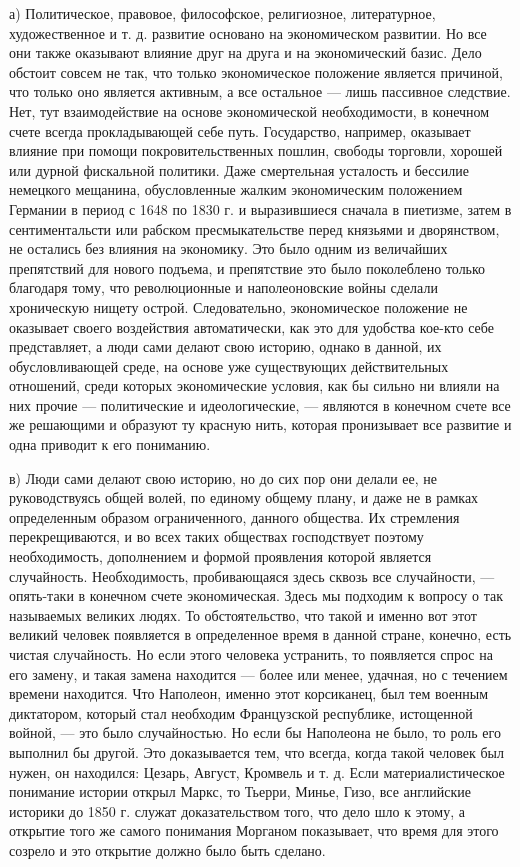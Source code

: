 \documentclass[12pt]{article}
\newcommand{\parnum}{(\arabic{parcount})}
\newcounter{parcount}
\newenvironment{parnumbers}{%
  \par%
  \everypar{\noindent \stepcounter{parcount}\marginpar[]{\parnum}}%
}{}
\begin{document}
\begin{parnumbers}
    а) Политическое, правовое, философское, религиозное, литературное, художественное и т. д. развитие основано на экономическом развитии. Но все они также оказывают влияние друг на друга и на экономический базис. Дело обстоит совсем не так, что только экономическое положение является причиной, что только оно является активным, а все остальное — лишь пассивное следствие. Нет, тут взаимодействие на основе экономической необходимости, в конечном счете всегда прокладывающей себе путь. Государство, например, оказывает влияние при помощи покровительственных пошлин, свободы торговли, хорошей или дурной фискальной политики. Даже смертельная усталость и бессилие немецкого мещанина, обусловленные жалким экономическим положением Германии в период с 1648 по 1830 г. и выразившиеся сначала в пиетизме, затем в сентиментальсти или рабском пресмыкательстве перед князьями и дворянством, не остались без влияния на экономику. Это было одним из величайших препятствий для нового подъема, и препятствие это было поколеблено только благодаря тому, что революционные и наполеоновские войны сделали хроническую нищету острой. Следовательно, экономическое положение не оказывает своего воздействия автоматически, как это для удобства кое-кто себе представляет, а люди сами делают свою историю, однако в данной, их обусловливающей среде, на основе уже существующих действительных отношений, среди которых экономические условия, как бы сильно ни влияли на них прочие — политические и идеологические, — являются в конечном счете все же решающими и образуют ту красную нить, которая пронизывает все развитие и одна приводит к его пониманию.

    в) Люди сами делают свою историю, но до сих пор они делали ее, не руководствуясь общей волей, по единому общему плану, и даже не в рамках определенным образом ограниченного, данного общества. Их стремления перекрещиваются, и во всех таких обществах господствует поэтому необходимость, дополнением и формой проявления которой является случайность. Необходимость, пробивающаяся здесь сквозь все случайности, — опять-таки в конечном счете экономическая. Здесь мы подходим к вопросу о так называемых великих людях. То обстоятельство, что такой и именно вот этот великий человек появляется в определенное время в данной стране, конечно, есть чистая случайность. Но если этого человека устранить, то появляется спрос на его замену, и такая замена находится — более или менее, удачная, но с течением времени находится. Что Наполеон, именно этот корсиканец, был тем военным диктатором, который стал необходим Французской республике, истощенной войной, — это было случайностью. Но если бы Наполеона не было, то роль его выполнил бы другой. Это доказывается тем, что всегда, когда такой человек был нужен, он находился: Цезарь, Август, Кромвель и т. д. Если материалистическое понимание истории открыл Маркс, то Тьерри, Минье, Гизо, все английские историки до 1850 г. служат доказательством того, что дело шло к этому, а открытие того же самого понимания Морганом показывает, что время для этого созрело и это открытие должно было быть сделано.


\end{parnumbers}
\end{document}
